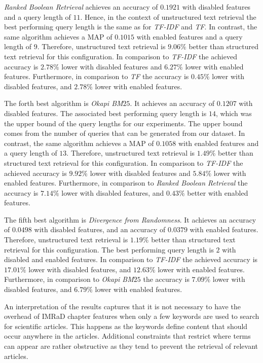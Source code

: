 \textit{Ranked Boolean Retrieval} achieves an accuracy of $0.1921$ with disabled features and a query length of $11$. Hence, in the context of unstructured text retrieval the best performing query length is the same as for \textit{TF-IDF} and \textit{TF}. In contrast, the same algorithm achieves a MAP of $0.1015$ with enabled features and a query length of $9$. Therefore, unstructured text retrieval is $9.06 \%$ better than structured text retrieval for this configuration. In comparison to \textit{TF-IDF} the achieved accuracy is $2.78 \%$ lower with disabled features and $6.27 \%$ lower with enabled features. Furthermore, in comparison to \textit{TF} the accuracy is $0.45 \%$ lower with disabled features, and $2.78 \%$ lower with enabled features.

The forth best algorithm is \textit{Okapi BM$25$}. It achieves an accuracy of $0.1207$ with disabled features. The associated best performing query length is $14$, which was the upper bound of the query lengths for our experiments. The upper bound comes from the number of queries that can be generated from our dataset. In contrast, the same algorithm achieves a MAP of $0.1058$ with enabled features and a query length of $13$. Therefore, unstructured text retrieval is $1.49 \%$ better than structured text retrieval for this configuration. In comparison to \textit{TF-IDF} the achieved accuracy is $9.92 \%$ lower with disabled features and $5.84 \%$ lower with enabled features. Furthermore, in comparison to \textit{Ranked Boolean Retrieval} the accuracy is $7.14 \%$ lower with disabled features, and $0.43 \%$ better with enabled features.

The fifth best algorithm is \textit{Divergence from Randomness}. It achieves an accuracy of $0.0498$ with disabled features, and an accuracy of $0.0379$ with enabled features. Therefore, unstructured text retrieval is $1.19 \%$ better than structured text retrieval for this configuration. The best performing query length is $2$ with disabled and enabled features. In comparison to \textit{TF-IDF} the achieved accuracy is $17.01 \%$ lower with disabled features, and $12.63 \%$ lower with enabled features. Furthermore, in comparison to \textit{Okapi BM$25$} the accuracy is $7.09 \%$ lower with disabled features, and $6.79 \%$ lower with enabled features.

An interpretation of the results captures that it is not necessary to have the overhead of IMRaD chapter features when only a few keywords are used to search for scientific articles. This happens as the keywords define content that should occur anywhere in the articles. Additional constraints that restrict where terms can appear are rather obstructive as they tend to prevent the retrieval of relevant articles.

